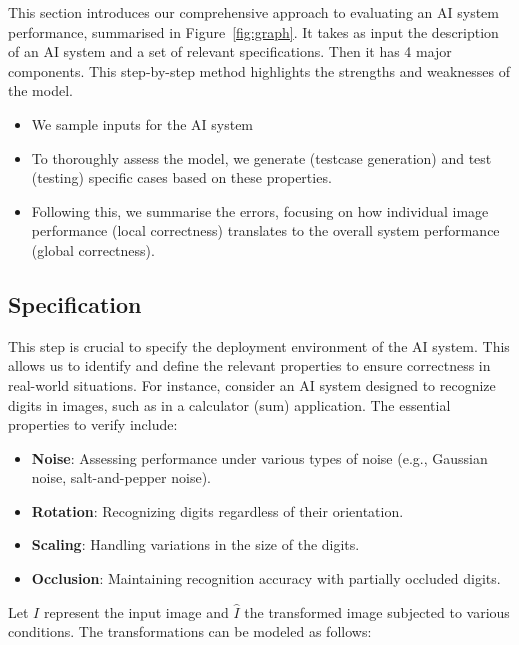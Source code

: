\documentclass[10pt, conference, a4paper, final]{IEEEtran}
\begin{document}
This section introduces our comprehensive approach to evaluating an AI system performance, summarised in Figure~\ref{fig:graph}. It takes as input the description of an AI system and a set of relevant specifications. Then it has 4 major components. This step-by-step method highlights the strengths and weaknesses of the model.
\begin{itemize}

\item We sample inputs for the AI system
\item To thoroughly assess the model, we generate (testcase generation) and test (testing) specific cases based on these properties.
  
\item Following this, we summarise the errors, focusing on how individual image performance (local correctness) translates to the overall system performance (global correctness). 
\end{itemize}


\subsection{Specification}

This step is crucial to specify the deployment environment of the AI system. This allows us to identify and define the relevant properties to ensure correctness in real-world situations. For instance, consider an AI system designed to recognize digits in images, such as in a calculator (sum)  application. The essential properties to verify include:

\begin{itemize}
    \item \textbf{Noise}: Assessing performance under various types of noise (e.g., Gaussian noise, salt-and-pepper noise).
    \item \textbf{Rotation}: Recognizing digits regardless of their orientation.
    \item \textbf{Scaling}: Handling variations in the size of the digits.

    \item \textbf{Occlusion}: Maintaining recognition accuracy with partially occluded digits.

\end{itemize}

Let \( I \) represent the input image and \( \hat{I} \) the transformed image subjected to various conditions. The transformations can be modeled as follows:
\end{document}

